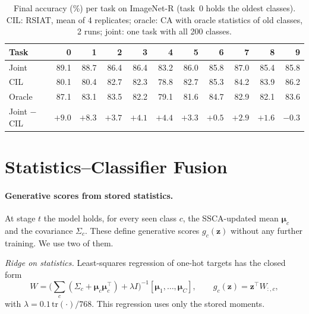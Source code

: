 \begin{table}[t]
\centering
\caption{Final accuracy (\%) per task on ImageNet-R (task~0 holds the oldest
classes). CIL: RSIAT, mean of 4 replicates; oracle: CA with oracle statistics
of old classes, 2 runs; joint: one task with all 200 classes.}
\label{tab:gap}
\setlength{\tabcolsep}{4pt}
\begin{tabular}{lrrrrrrrrrr}
\toprule
Task & 0 & 1 & 2 & 3 & 4 & 5 & 6 & 7 & 8 & 9\\
\midrule
Joint  & 89.1 & 88.7 & 86.4 & 86.4 & 83.2 & 86.0 & 85.8 & 87.0 & 85.4 & 85.8\\
CIL    & 80.1 & 80.4 & 82.7 & 82.3 & 78.8 & 82.7 & 85.3 & 84.2 & 83.9 & 86.2\\
Oracle & 87.1 & 83.1 & 83.5 & 82.2 & 79.1 & 81.6 & 84.7 & 82.9 & 82.1 & 83.6\\
\midrule
Joint $-$ CIL & $+9.0$ & $+8.3$ & $+3.7$ & $+4.1$ & $+4.4$ & $+3.3$ & $+0.5$ & $+2.9$ & $+1.6$ & $-0.3$\\
\bottomrule
\end{tabular}
\end{table}

\section{Statistics--Classifier Fusion}
\label{sec:method}

\paragraph{Generative scores from stored statistics.}
At stage $t$ the model holds, for every seen class $c$, the SSCA-updated mean
$\boldsymbol\mu_c$ and the covariance $\Sigma_c$. These define generative
scores $g_c(\mathbf z)$ without any further training. We use two of them.

\emph{Ridge on statistics.} Least-squares regression of one-hot targets has
the closed form
\begin{equation}
  W=\Big(\textstyle\sum_c(\Sigma_c+\boldsymbol\mu_c\boldsymbol\mu_c^{\top})+\lambda I\Big)^{-1}
  [\boldsymbol\mu_1,\dots,\boldsymbol\mu_C],\qquad g_c(\mathbf z)=\mathbf z^{\top}W_{:,c},
  \label{eq:ridge}
\end{equation}
with $\lambda=0.1\,\mathrm{tr}(\cdot)/768$. This regression uses only the
stored moments.

